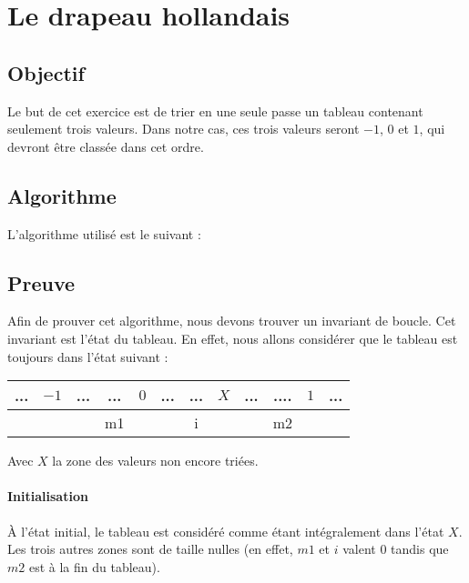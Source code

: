 \section{Le drapeau hollandais}
\subsection{Objectif}
Le but de cet exercice est de trier en une seule passe un tableau contenant
seulement trois valeurs. Dans notre cas, ces trois valeurs seront $-1$, $0$ et
$1$, qui devront être classée dans cet ordre.

\subsection{Algorithme}
L'algorithme utilisé est le suivant : \newline
\begin{algorithm}[H]
    \SetAlgoLined
\end{algorithm}

\subsection{Preuve}
Afin de prouver cet algorithme, nous devons trouver un invariant de boucle. Cet
invariant est l'état du tableau. En effet, nous allons considérer que le
tableau est toujours dans l'état suivant :

\begin{center}
    \begin{tabular}{|ccc|ccc|ccc|ccc|}
        \hline
        ... & $-1$ & ... & ... & $0$ & ... & ... & $X$ & ... & .... & $1$ & ...\\
        \hline
            &&& m1 &&& i &&& m2 && \\
    \end{tabular}
\end{center}

Avec $X$ la zone des valeurs non encore triées.

\paragraph{Initialisation} À l'état initial, le tableau est considéré comme
étant intégralement dans l'état $X$. Les trois autres zones sont de taille
nulles (en effet, $m1$ et $i$ valent $0$ tandis que $m2$ est à la fin du
tableau).

